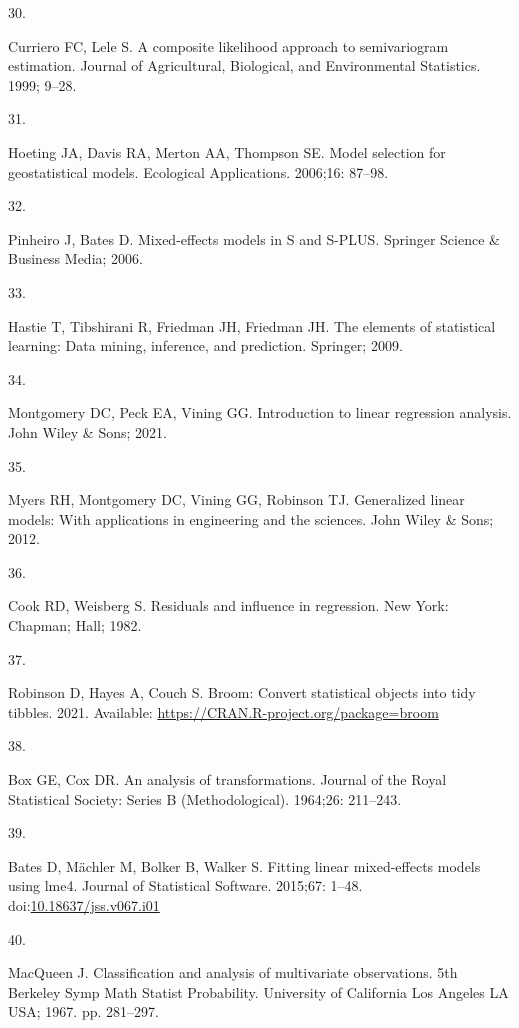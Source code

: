 \documentclass[10pt,letterpaper]{article}
\newlength{\cslhangindent}
\newlength{\csllabelwidth}
\newlength{\cslentryspacingunit} %
\newenvironment{CSLReferences}[2] %
 {%
  \setlength{\parindent}{0pt}
  \ifodd #1
  \let\oldpar\par
  \def\par{\hangindent=\cslhangindent\oldpar}
  \fi
  \setlength{\parskip}{#2\cslentryspacingunit}
 }%
 {}
\newcommand{\CSLLeftMargin}[1]{\parbox[t]{\csllabelwidth}{#1}}
\newcommand{\CSLRightInline}[1]{\parbox[t]{\linewidth - \csllabelwidth}{#1}\break}
\begin{document}
\begin{CSLReferences}{0}{0}
\leavevmode\hypertarget{ref-curriero1999composite}{}%
\CSLLeftMargin{30. }
\CSLRightInline{Curriero FC, Lele S. A composite likelihood approach to
semivariogram estimation. Journal of Agricultural, Biological, and
Environmental Statistics. 1999; 9--28. }

\leavevmode\hypertarget{ref-hoeting2006model}{}%
\CSLLeftMargin{31. }
\CSLRightInline{Hoeting JA, Davis RA, Merton AA, Thompson SE. Model
selection for geostatistical models. Ecological Applications. 2006;16:
87--98. }

\leavevmode\hypertarget{ref-pinheiro2006mixed}{}%
\CSLLeftMargin{32. }
\CSLRightInline{Pinheiro J, Bates D. Mixed-effects models in {S} and
{S-PLUS}. Springer Science \& Business Media; 2006. }

\leavevmode\hypertarget{ref-hastie2009elements}{}%
\CSLLeftMargin{33. }
\CSLRightInline{Hastie T, Tibshirani R, Friedman JH, Friedman JH. The
elements of statistical learning: Data mining, inference, and
prediction. Springer; 2009. }

\leavevmode\hypertarget{ref-montgomery2021introduction}{}%
\CSLLeftMargin{34. }
\CSLRightInline{Montgomery DC, Peck EA, Vining GG. Introduction to
linear regression analysis. John Wiley \& Sons; 2021. }

\leavevmode\hypertarget{ref-myers2012generalized}{}%
\CSLLeftMargin{35. }
\CSLRightInline{Myers RH, Montgomery DC, Vining GG, Robinson TJ.
Generalized linear models: With applications in engineering and the
sciences. John Wiley \& Sons; 2012. }

\leavevmode\hypertarget{ref-cook1982residuals}{}%
\CSLLeftMargin{36. }
\CSLRightInline{Cook RD, Weisberg S. Residuals and influence in
regression. New York: Chapman; Hall; 1982. }

\leavevmode\hypertarget{ref-robinson2021broom}{}%
\CSLLeftMargin{37. }
\CSLRightInline{Robinson D, Hayes A, Couch S. Broom: Convert statistical
objects into tidy tibbles. 2021. Available:
\url{https://CRAN.R-project.org/package=broom}}

\leavevmode\hypertarget{ref-box1964analysis}{}%
\CSLLeftMargin{38. }
\CSLRightInline{Box GE, Cox DR. An analysis of transformations. Journal
of the Royal Statistical Society: Series {B} (Methodological). 1964;26:
211--243. }

\leavevmode\hypertarget{ref-bates2015lme4}{}%
\CSLLeftMargin{39. }
\CSLRightInline{Bates D, Mächler M, Bolker B, Walker S. Fitting linear
mixed-effects models using {lme4}. Journal of Statistical Software.
2015;67: 1--48.
doi:\href{https://doi.org/10.18637/jss.v067.i01}{10.18637/jss.v067.i01}}

\leavevmode\hypertarget{ref-macqueen1967classification}{}%
\CSLLeftMargin{40. }
\CSLRightInline{MacQueen J. Classification and analysis of multivariate
observations. 5th {Berkeley} {Symp} {Math} {Statist} {Probability}.
University of California Los Angeles LA USA; 1967. pp. 281--297. }

\end{CSLReferences}

\nolinenumbers
\end{document}
